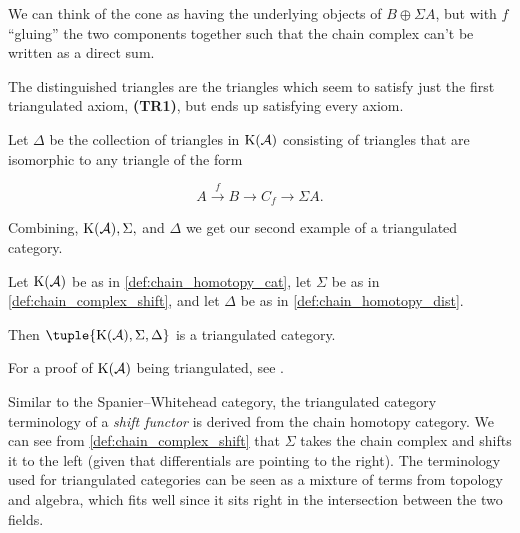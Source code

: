 We can think of the cone as having the underlying objects of \( B \oplus \Sigma A \), but with \( f \) ``gluing'' the two components together such that the chain complex can't be written as a direct sum.

The distinguished triangles are the triangles which seem to satisfy just the first triangulated axiom, {\bf (TR1)}, but ends up satisfying every axiom.

\begin{definition}
    \label{def:chain_homotopy_dist}
    Let \( \Delta \) be the collection of triangles in \( \operatorname{K}({\mathcal{A}}) \) consisting of triangles that are isomorphic to any triangle of the form

    \[
        A \stackrel{f}{\to} B \to C_f \to \Sigma A.
    \]
\end{definition}

Combining, \( \operatorname{K}({\mathcal{A}}), \Sigma, \) and \( \Delta \) we get our second example of a triangulated category.

\begin{example}
    Let \( \operatorname{K}({\mathcal{A}}) \) be as in \autoref{def:chain_homotopy_cat}, let \( \Sigma \) be as in \autoref{def:chain_complex_shift}, and let \( \Delta \) be as in \autoref{def:chain_homotopy_dist}.

    Then \( \tuple{\K(\Ac), \Sigma, \Delta} \) is a triangulated category.
\end{example}
For a proof of \( \operatorname{K}({\mathcal{A}}) \) being triangulated, see \cite[Proposition 3.5.25]{Zimmermann_2014}.

Similar to the Spanier--Whitehead category, the triangulated category terminology of a \emph{shift functor} is derived from the chain homotopy category. We can see from \autoref{def:chain_complex_shift} that \( \Sigma \) takes the chain complex and shifts it to the left (given that differentials are pointing to the right). The terminology used for triangulated categories can be seen as a mixture of terms from topology and algebra, which fits well since it sits right in the intersection between the two fields.
